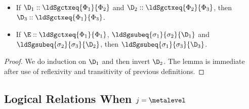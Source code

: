 \begin{lemma}[Transitivity] $ $
  \begin{itemize}
  \item If $\D_1 :: \ldSgctxeq{\Phi_1}{\Phi_2}$ and $\D_2 ::
    \ldSgctxeq{\Phi_2}{\Phi_3}$, then $\D_3 :: \ldSgctxeq{\Phi_1}{\Phi_3}$.
  \item If $\E :: \ldSgctxeq{\Phi_1}{\Phi_1}$, $\ldSgsubeq{\sigma_1}{\sigma_2}{\D_1}$ and
    $\ldSgsubeq{\sigma_2}{\sigma_3}{\D_2}$, then $\ldSgsubeq{\sigma_1}{\sigma_3}{\D_3}$.
  \end{itemize}
\end{lemma}
\begin{proof}
  We do induction on $\D_1$ and then invert
  $\D_2$. %
  The lemma is immediate after use of reflexivity and transitivity of previous
  definitions.  %
\end{proof}

\subsection{Logical Relations When $j = \metalevel$}

